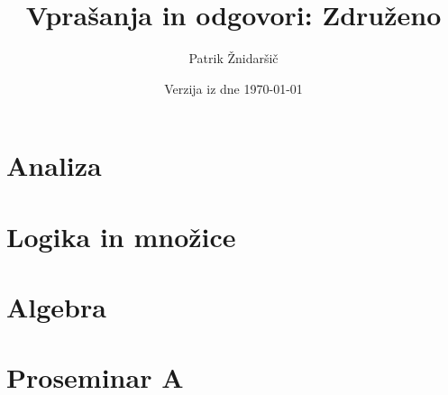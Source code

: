 \documentclass[11pt]{report}
\title{Vprašanja in odgovori: Združeno}
\author{Patrik Žnidaršič}
\date{Verzija iz dne \today}
\begin{document}
\maketitle
\tableofcontents

\chapter{Analiza}


\chapter{Logika in množice}


\chapter{Algebra}


\chapter{Proseminar A}

	
\end{document}
